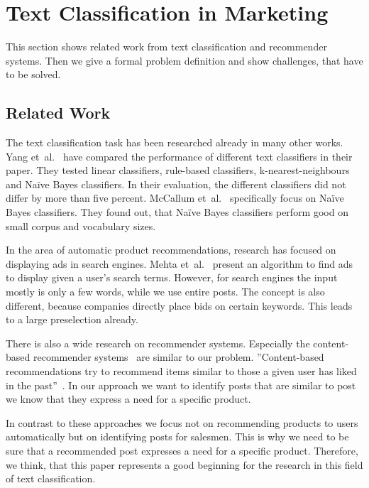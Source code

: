 
\section{Text Classification in Marketing}
\label{sec:background}

This section shows related work from text classification and recommender systems.
Then we give a formal problem definition and show challenges, that have to be solved.

\subsection{Related Work}
The text classification task has been researched already in many other works.
Yang et~al.~\cite{yang1999re} have compared the performance of different text classifiers in their paper.
They tested linear classifiers, rule-based classifiers, k-nearest-neighbours and Na\"ive Bayes classifiers.
In their evaluation, the different classifiers did not differ by more than five percent.
McCallum et~al.~\cite{mccallum1998comparison} specifically focus on Na\"ive Bayes classifiers.
They found out, that Na\"ive Bayes classifiers perform good on small corpus and vocabulary sizes.

In the area of automatic product recommendations, research has focused on displaying ads in search engines.
Mehta et~al.~\cite{mehta2007adwords} present an algorithm to find ads to display given a user's search terms.
However, for search engines the input mostly is only a few words, while we use entire posts.
The concept is also different, because companies directly place bids on certain keywords.
This leads to a large preselection already.

There is also a wide research on recommender systems. 
Especially the content-based recommender systems~\cite{lops2011content} are similar to our problem.
''Content-based recommendations try to recommend items similar to those a given user has liked in the past''~\cite{lops2011content}.
In our approach we want to identify posts that are similar to post we know that they express a need for a specific product.


In contrast to these approaches we focus not on recommending products to users automatically but on identifying posts for salesmen.
This is why we need to be sure that a recommended post expresses a need for a specific product.
Therefore, we think, that this paper represents a good beginning for the research in this field of text classification.


